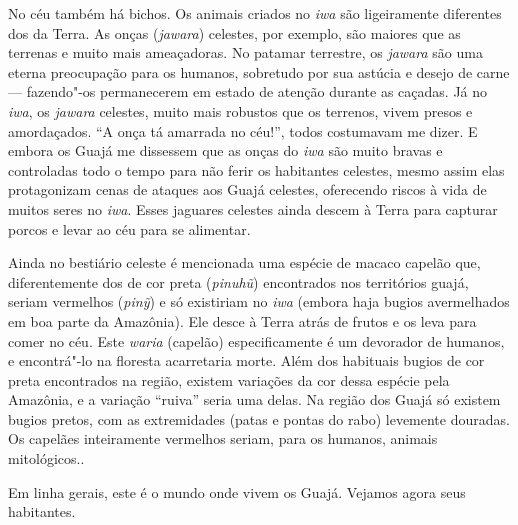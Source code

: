 No céu também há bichos. Os animais criados no \emph{iwa} são
ligeiramente diferentes dos da Terra. As onças (\emph{jawara}) celestes,
por exemplo, são maiores que as terrenas e muito mais ameaçadoras. No
patamar terrestre, os \emph{jawara} são uma eterna preocupação para os
humanos, sobretudo por sua astúcia e desejo de carne --- fazendo"-os
permanecerem em estado de atenção durante as caçadas. Já no \emph{iwa},
os \emph{jawara} celestes, muito mais robustos que os terrenos, vivem
presos e amordaçados. ``A onça tá amarrada no céu!'', todos costumavam me
dizer. E embora os Guajá me dissessem que as onças do \emph{iwa} são
muito bravas e controladas todo o tempo para não ferir os habitantes
celestes, mesmo assim elas protagonizam cenas de ataques aos Guajá
celestes, oferecendo riscos à vida de muitos seres no \emph{iwa}. Esses
jaguares celestes ainda descem à Terra para capturar porcos e levar ao
céu para se alimentar.

Ainda no bestiário celeste é mencionada uma espécie de macaco capelão
que, diferentemente dos de cor preta (\emph{pinuhũ}) encontrados nos
territórios guajá, seriam vermelhos (\emph{pinỹ}) e só existiriam no
\emph{iwa} (embora haja bugios avermelhados em boa parte da Amazônia).
Ele desce à Terra atrás de frutos e os leva para comer no céu. Este
\emph{waria} (capelão) especificamente é um devorador de humanos, e
encontrá"-lo na floresta acarretaria morte. Além dos habituais bugios de
cor preta encontrados na região, existem variações da cor dessa espécie
pela Amazônia, e a variação ``ruiva'' seria uma delas. Na região dos
Guajá só existem bugios pretos, com as extremidades (patas e pontas do
rabo) levemente douradas. Os capelães inteiramente vermelhos seriam,
para os humanos, animais mitológicos..

Em linha gerais, este é o mundo onde vivem os Guajá. Vejamos agora seus
habitantes.
